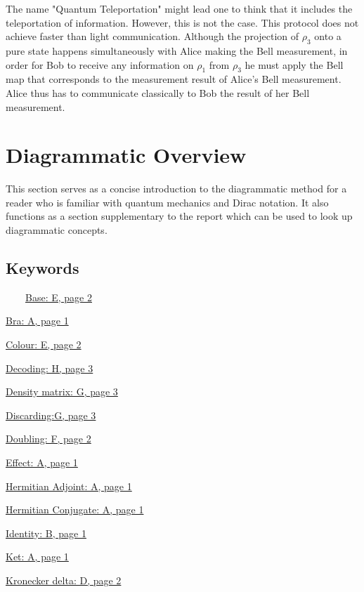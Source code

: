 \documentclass[]{article}
\begin{document}
The name "Quantum Teleportation" might lead one to think that it includes the teleportation of information. However, this is not the case. This protocol does not achieve faster than light communication. Although the projection of $\rho_{3}$ onto a pure state happens simultaneously with Alice making the Bell measurement, in order for Bob to receive any information on $\rho_1$ from $\rho_{3}$ he must apply the Bell map that corresponds to the measurement result of Alice's Bell measurement. Alice thus has to communicate classically to Bob the result of her Bell measurement.




\appendix
{}
\twocolumn

\section{Diagrammatic Overview}

This section serves as a concise introduction to the diagrammatic method for a reader who is familiar with quantum mechanics and Dirac notation. It also functions as a section supplementary to the report which can be used to look up diagrammatic concepts.

\subsection{Keywords}


~~~~\hyperref[coloursandbases]{Base: E, page 2}

\hyperref[braandket]{Bra: A, page 1}

\hyperref[coloursandbases]{Colour: E, page 2}

\hyperref[phasespiders]{Decoding: H, page 3}

\hyperref[discarding]{Density matrix: G, page 3}

\hyperref[discarding]{Discarding:G, page 3}

\hyperref[doubling]{Doubling: F, page 2}

\hyperref[braandket]{Effect: A, page 1}

\hyperref[braandket]{Hermitian Adjoint: A, page 1}

\hyperref[braandket]{Hermitian Conjugate: A, page 1}

\hyperref[identity]{Identity: B, page 1}

\hyperref[braandket]{Ket: A, page 1}

\hyperref[spiders]{Kronecker delta: D, page 2}
\end{document}
